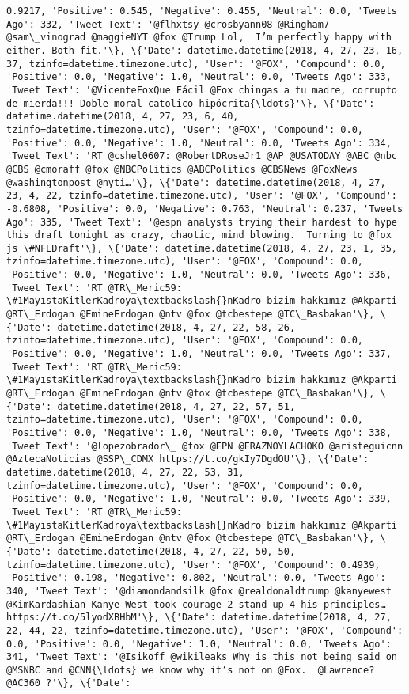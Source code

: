 \documentclass[11pt]{article}
\begin{document}
\begin{Verbatim}[commandchars=\\\{\}]
0.9217, 'Positive': 0.545, 'Negative': 0.455, 'Neutral': 0.0, 'Tweets Ago': 332, 'Tweet Text': '@flhxtsy @crosbyann08 @Ringham7 @sam\_vinograd @maggieNYT @fox @Trump Lol,  I’m perfectly happy with either. Both fit.'\}, \{'Date': datetime.datetime(2018, 4, 27, 23, 16, 37, tzinfo=datetime.timezone.utc), 'User': '@FOX', 'Compound': 0.0, 'Positive': 0.0, 'Negative': 1.0, 'Neutral': 0.0, 'Tweets Ago': 333, 'Tweet Text': '@VicenteFoxQue Fácil @Fox chingas a tu madre, corrupto de mierda!!! Doble moral catolico hipócrita{\ldots}'\}, \{'Date': datetime.datetime(2018, 4, 27, 23, 6, 40, tzinfo=datetime.timezone.utc), 'User': '@FOX', 'Compound': 0.0, 'Positive': 0.0, 'Negative': 1.0, 'Neutral': 0.0, 'Tweets Ago': 334, 'Tweet Text': 'RT @cshel0607: @RobertDRoseJr1 @AP @USATODAY @ABC @nbc @CBS @cmoraff @fox @NBCPolitics @ABCPolitics @CBSNews @FoxNews @washingtonpost @nyti…'\}, \{'Date': datetime.datetime(2018, 4, 27, 23, 4, 22, tzinfo=datetime.timezone.utc), 'User': '@FOX', 'Compound': -0.6808, 'Positive': 0.0, 'Negative': 0.763, 'Neutral': 0.237, 'Tweets Ago': 335, 'Tweet Text': '@espn analysts trying their hardest to hype this draft tonight as crazy, chaotic, mind blowing.  Turning to @fox js \#NFLDraft'\}, \{'Date': datetime.datetime(2018, 4, 27, 23, 1, 35, tzinfo=datetime.timezone.utc), 'User': '@FOX', 'Compound': 0.0, 'Positive': 0.0, 'Negative': 1.0, 'Neutral': 0.0, 'Tweets Ago': 336, 'Tweet Text': 'RT @TR\_Meric59: \#1MayıstaKitlerKadroya\textbackslash{}nKadro bizim hakkımız @Akparti @RT\_Erdogan @EmineErdogan @ntv @fox @tcbestepe @TC\_Basbakan'\}, \{'Date': datetime.datetime(2018, 4, 27, 22, 58, 26, tzinfo=datetime.timezone.utc), 'User': '@FOX', 'Compound': 0.0, 'Positive': 0.0, 'Negative': 1.0, 'Neutral': 0.0, 'Tweets Ago': 337, 'Tweet Text': 'RT @TR\_Meric59: \#1MayıstaKitlerKadroya\textbackslash{}nKadro bizim hakkımız @Akparti @RT\_Erdogan @EmineErdogan @ntv @fox @tcbestepe @TC\_Basbakan'\}, \{'Date': datetime.datetime(2018, 4, 27, 22, 57, 51, tzinfo=datetime.timezone.utc), 'User': '@FOX', 'Compound': 0.0, 'Positive': 0.0, 'Negative': 1.0, 'Neutral': 0.0, 'Tweets Ago': 338, 'Tweet Text': '@lopezobrador\_ @fox @EPN @ERAZNOYLACHOKO @aristeguicnn @AztecaNoticias @SSP\_CDMX https://t.co/gkIy7DgdOU'\}, \{'Date': datetime.datetime(2018, 4, 27, 22, 53, 31, tzinfo=datetime.timezone.utc), 'User': '@FOX', 'Compound': 0.0, 'Positive': 0.0, 'Negative': 1.0, 'Neutral': 0.0, 'Tweets Ago': 339, 'Tweet Text': 'RT @TR\_Meric59: \#1MayıstaKitlerKadroya\textbackslash{}nKadro bizim hakkımız @Akparti @RT\_Erdogan @EmineErdogan @ntv @fox @tcbestepe @TC\_Basbakan'\}, \{'Date': datetime.datetime(2018, 4, 27, 22, 50, 50, tzinfo=datetime.timezone.utc), 'User': '@FOX', 'Compound': 0.4939, 'Positive': 0.198, 'Negative': 0.802, 'Neutral': 0.0, 'Tweets Ago': 340, 'Tweet Text': '@diamondandsilk @fox @realdonaldtrump @kanyewest @KimKardashian Kanye West took courage 2 stand up 4 his principles… https://t.co/5lyodXBHbM'\}, \{'Date': datetime.datetime(2018, 4, 27, 22, 44, 22, tzinfo=datetime.timezone.utc), 'User': '@FOX', 'Compound': 0.0, 'Positive': 0.0, 'Negative': 1.0, 'Neutral': 0.0, 'Tweets Ago': 341, 'Tweet Text': '@Isikoff @wikileaks Why is this not being said on @MSNBC and @CNN{\ldots} we know why it’s not on @Fox.  @Lawrence? @AC360 ?'\}, \{'Date': 
\end{Verbatim}
\end{document}

